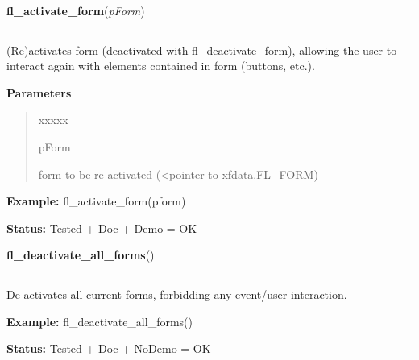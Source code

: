 \hspace{.8\funcindent}\begin{boxedminipage}{\funcwidth}

    \raggedright \textbf{fl\_activate\_form}(\textit{pForm})

    \vspace{-1.5ex}

    \rule{\textwidth}{0.5\fboxrule}
\setlength{\parskip}{2ex}
    (Re)activates form (deactivated with fl\_deactivate\_form), allowing 
    the user to interact again with elements contained in form (buttons, 
    etc.).

\setlength{\parskip}{1ex}
      \textbf{Parameters}
      \vspace{-1ex}

      \begin{quote}
        \begin{Ventry}{xxxxx}

          \item[pForm]

          form to be re-activated ({\textless}pointer to xfdata.FL\_FORM)

        \end{Ventry}

      \end{quote}

\textbf{Example:} fl\_activate\_form(pform)



\textbf{Status:} Tested + Doc + Demo = OK



    \end{boxedminipage}

    \label{xformslib:library:fl_deactivate_all_forms}

    \vspace{0.5ex}

\hspace{.8\funcindent}\begin{boxedminipage}{\funcwidth}

    \raggedright \textbf{fl\_deactivate\_all\_forms}()

    \vspace{-1.5ex}

    \rule{\textwidth}{0.5\fboxrule}
\setlength{\parskip}{2ex}
    De-activates all current forms, forbidding any event/user interaction.

\setlength{\parskip}{1ex}
\textbf{Example:} fl\_deactivate\_all\_forms()



\textbf{Status:} Tested + Doc + NoDemo = OK



    \end{boxedminipage}

